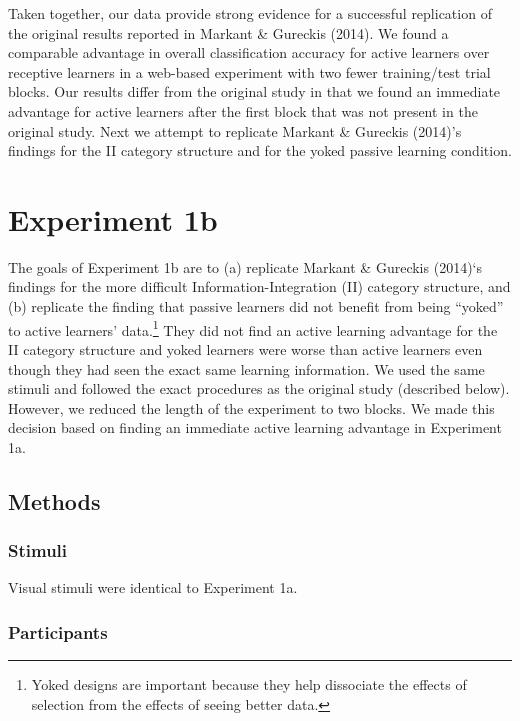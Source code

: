 \documentclass[10pt, letterpaper]{article}
\begin{document}
Taken together, our data provide strong evidence for a successful
replication of the original results reported in Markant \& Gureckis
(2014). We found a comparable advantage in overall classification
accuracy for active learners over receptive learners in a web-based
experiment with two fewer training/test trial blocks. Our results differ
from the original study in that we found an immediate advantage for
active learners after the first block that was not present in the
original study. Next we attempt to replicate Markant \& Gureckis
(2014)'s findings for the II category structure and for the yoked
passive learning condition.

\section{Experiment 1b}\label{experiment-1b}

The goals of Experiment 1b are to (a) replicate Markant \& Gureckis
(2014)`s findings for the more difficult Information-Integration (II)
category structure, and (b) replicate the finding that passive learners
did not benefit from being ``yoked'' to active learners'
data.\footnote{Yoked designs are important because they help dissociate the effects of selection from the effects of seeing better data.}
They did not find an active learning advantage for the II category
structure and yoked learners were worse than active learners even though
they had seen the exact same learning information. We used the same
stimuli and followed the exact procedures as the original study
(described below). However, we reduced the length of the experiment to
two blocks. We made this decision based on finding an immediate active
learning advantage in Experiment 1a.

\subsection{Methods}\label{methods-1}

\subsubsection{Stimuli}\label{stimuli-1}

Visual stimuli were identical to Experiment 1a.

\subsubsection{Participants}\label{participants-1}
\end{document}
